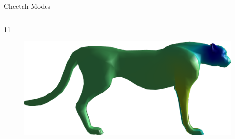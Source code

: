\documentclass{beamer}
\begin{document}
\begin{frame}{Cheetah Modes}
\begin{columns}
\begin{column}[T]{5cm}
\begin{figure}[t]
\end{figure}
11
\begin{figure}[t]
    \includegraphics[width=\textwidth]{Harmonics/CheetahModes/11.png}
\end{figure}
\end{column}
\end{columns}

\end{frame}
\end{document}
